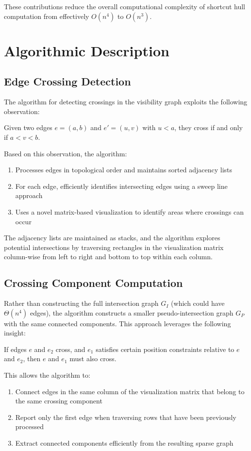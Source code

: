 \documentclass[10pt,letterpaper]{article}
\begin{document}
These contributions reduce the overall computational complexity of shortcut hull computation from effectively $O(n^4)$ to $O(n^3)$.

\section{Algorithmic Description}

\subsection{Edge Crossing Detection}
The algorithm for detecting crossings in the visibility graph exploits the following observation:

Given two edges $e = (a, b)$ and $e' = (u, v)$ with $u < a$, they cross if and only if $a < v < b$.

Based on this observation, the algorithm:
\begin{enumerate}
    \item Processes edges in topological order and maintains sorted adjacency lists
    \item For each edge, efficiently identifies intersecting edges using a sweep line approach
    \item Uses a novel matrix-based visualization to identify areas where crossings can occur
\end{enumerate}

The adjacency lists are maintained as stacks, and the algorithm explores potential intersections by traversing rectangles in the visualization matrix column-wise from left to right and bottom to top within each column.

\subsection{Crossing Component Computation}
Rather than constructing the full intersection graph $G_I$ (which could have $\Theta(n^4)$ edges), the algorithm constructs a smaller pseudo-intersection graph $G_P$ with the same connected components. This approach leverages the following insight:

If edges $e$ and $e_2$ cross, and $e_1$ satisfies certain position constraints relative to $e$ and $e_2$, then $e$ and $e_1$ must also cross.

This allows the algorithm to:
\begin{enumerate}
    \item Connect edges in the same column of the visualization matrix that belong to the same crossing component
    \item Report only the first edge when traversing rows that have been previously processed
    \item Extract connected components efficiently from the resulting sparse graph
\end{enumerate}
\end{document}
